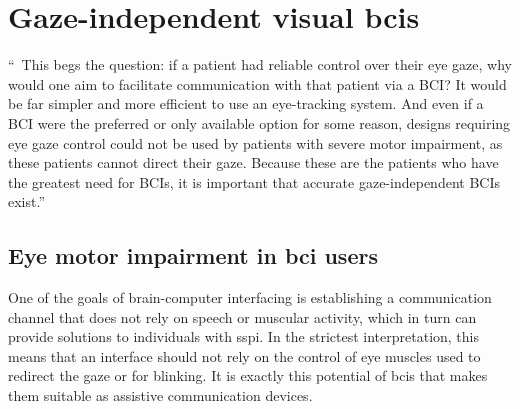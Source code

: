 \chapter{Gaze-independent visual \acsp{bci}}
\label{sec:gaze-independent}
\epigraph{%
  \justifying
  ``\elide\ This begs the question: if a patient had reliable control
  over their eye gaze, why would one aim to facilitate communication with that
  patient via a BCI? It would be far simpler and more efficient to use an
  eye-tracking system.
  And even if a BCI were the preferred or only available option for some reason,
  designs requiring eye gaze control could not be used
  by patients with severe motor impairment, as these patients
  cannot direct their gaze.
  Because these are the patients who have the greatest need for BCIs, it is
  important that accurate gaze-independent BCIs exist.''
}{%
  \textcite{Egan2017}
}


\section{Eye motor impairment in \acs{bci} users}%
\label{sec:gaze-dependence}

One of the goals of brain-computer interfacing is establishing a communication
channel that does not rely on speech or muscular activity, which in turn can
provide solutions to individuals with \ac{sspi}.
In the strictest interpretation, this means that an interface should not
rely on the control of eye muscles used to redirect the gaze or for blinking.
It is exactly this potential of \acp{bci} that makes them suitable as assistive
communication devices.

